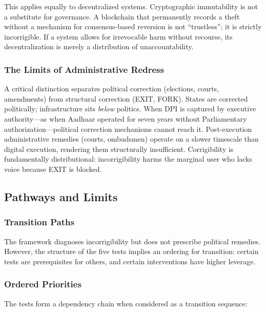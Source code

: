 \documentclass{article}
\begin{document}
This applies equally to decentralized systems. Cryptographic immutability is not a substitute for governance. A blockchain that permanently records a theft without a mechanism for consensus-based reversion is not ``trustless''; it is strictly incorrigible. If a system allows for irrevocable harm without recourse, its decentralization is merely a distribution of unaccountability.

\subsubsection{The Limits of Administrative Redress}

A critical distinction separates political correction (elections, courts, amendments) from structural correction (EXIT, FORK). States are corrected politically; infrastructure sits \textit{below} politics. When DPI is captured by executive authority---as when Aadhaar operated for seven years without Parliamentary authorization---political correction mechanisms cannot reach it. Post-execution administrative remedies (courts, ombudsmen) operate on a slower timescale than digital execution, rendering them structurally insufficient. Corrigibility is fundamentally distributional: incorrigibility harms the marginal user who lacks voice because EXIT is blocked.

\subsection{Pathways and Limits}
\label{subsec:pathways}

\subsubsection{Transition Paths}
\label{subsec:transition}

The framework diagnoses incorrigibility but does not prescribe political remedies. However, the structure of the five tests implies an ordering for transition: certain tests are prerequisites for others, and certain interventions have higher leverage.

\subsubsection{Ordered Priorities}

The tests form a dependency chain when considered as a transition sequence:
\end{document}
